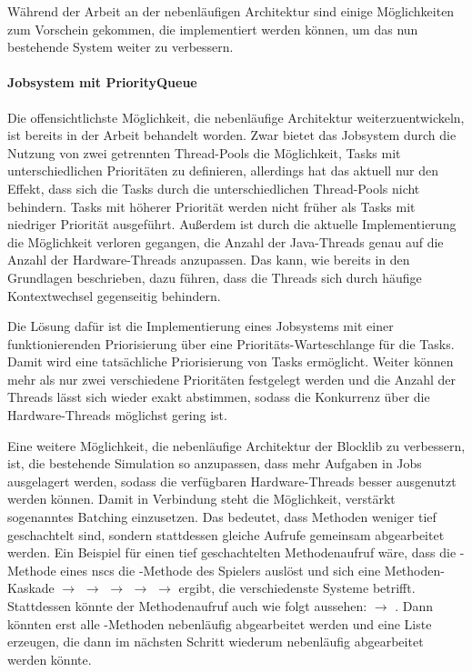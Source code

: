 Während der Arbeit an der nebenläufigen Architektur sind einige Möglichkeiten zum Vorschein gekommen, die implementiert werden können, um das nun bestehende System weiter zu verbessern.
\paragraph{Jobsystem mit PriorityQueue}
Die offensichtlichste Möglichkeit, die nebenläufige Architektur weiterzuentwickeln, ist bereits in der Arbeit behandelt worden. Zwar bietet das Jobsystem durch die Nutzung von zwei getrennten Thread-Pools die Möglichkeit, Tasks mit unterschiedlichen Prioritäten zu definieren, allerdings hat das aktuell nur den Effekt, dass sich die Tasks durch die unterschiedlichen Thread-Pools nicht behindern. Tasks mit höherer Priorität werden nicht früher als Tasks mit niedriger Priorität ausgeführt. Außerdem ist durch die aktuelle Implementierung die Möglichkeit verloren gegangen, die Anzahl der Java-Threads genau auf die Anzahl der Hardware-Threads anzupassen. Das kann, wie bereits in den Grundlagen beschrieben, dazu führen, dass die Threads sich durch häufige Kontextwechsel gegenseitig behindern.

Die Lösung dafür ist die Implementierung eines Jobsystems mit einer funktionierenden Priorisierung über eine Prioritäts-Warteschlange für die Tasks. Damit wird eine tatsächliche Priorisierung von Tasks ermöglicht. Weiter können mehr als nur zwei verschiedene Prioritäten festgelegt werden und die Anzahl der Threads lässt sich wieder exakt abstimmen, sodass die Konkurrenz über die Hardware-Threads möglichst gering ist.

Eine weitere Möglichkeit, die nebenläufige Architektur der Blocklib zu verbessern, ist, die bestehende Simulation so anzupassen, dass mehr Aufgaben in Jobs ausgelagert werden, sodass die verfügbaren Hardware-Threads besser ausgenutzt werden können. Damit in Verbindung steht die Möglichkeit, verstärkt sogenanntes Batching einzusetzen. Das bedeutet, dass Methoden weniger tief geschachtelt sind, sondern stattdessen gleiche Aufrufe gemeinsam abgearbeitet werden.
Ein Beispiel für einen tief geschachtelten Methodenaufruf wäre, dass die -Methode eines \acsp{nsc} die -Methode des Spielers auslöst und sich eine Methoden-Kaskade  $\to$  $\to$  $\to$  $\to$  $\to$  ergibt, die verschiedenste Systeme betrifft. Stattdessen könnte der Methodenaufruf auch wie folgt aussehen:  $\to$ . Dann könnten erst alle 
-Methoden nebenläufig abgearbeitet werden und eine Liste erzeugen, die dann im nächsten Schritt wiederum nebenläufig abgearbeitet werden könnte. 

